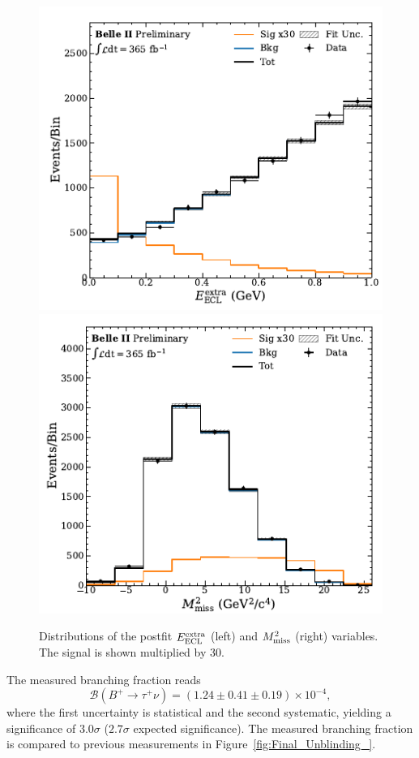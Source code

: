 \documentclass{moriond}
\def\eecl{E_{\rm ECL}^{\rm extra}}
\def\mmiss{M_{\rm miss}^2}
\begin{document}
\begin{figure}[h!]
    \centering
    \includegraphics[scale=0.5]{eeclextra.pdf}
    \includegraphics[scale=0.5]{mmiss.pdf}
    \caption{Distributions of the postfit $\eecl$ (left) and $\mmiss$ (right) variables. The signal is shown multiplied by 30.}
    \label{fig:gio_distributions}
\end{figure}
The measured branching fraction reads
\begin{equation}
    \mathcal{B}(B^+ \to \tau^+\nu) = (1.24 \pm 0.41 \pm 0.19)\times 10^{-4},
\end{equation}
where the first uncertainty is statistical and the second systematic, yielding a significance of $3.0\sigma$ ($2.7\sigma$ expected significance). The measured branching fraction is compared to previous measurements  in Figure~\ref{fig:Final_Unblinding_}.
\end{document}
